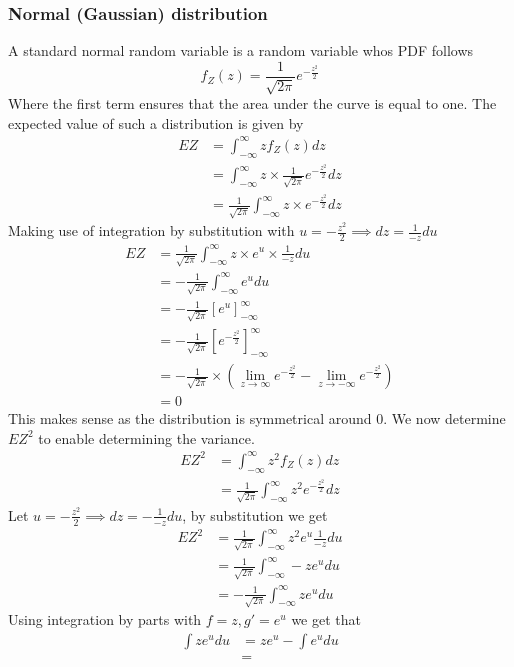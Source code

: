 \subsubsection{Normal (Gaussian) distribution}
A standard normal random variable is a random variable whos PDF follows
\[
    f_{Z}(z)=\frac{1}{\sqrt{2\pi}}e^{-\frac{z^{2}}{2}}
\]
Where the first term ensures that the area under the curve is equal to one. The expected value of such a distribution is given by
\begin{align*}
    EZ&=\int_{-\infty}^{\infty}zf_{Z}(z)dz \\
      &=\int_{-\infty}^{\infty}z\times\frac{1}{\sqrt{2\pi}}e^{-\frac{z^{2}}{2}}dz \\
      &=\frac{1}{\sqrt{2\pi}}\int_{-\infty}^{\infty}z\times e^{-\frac{z^{2}}{2}}dz 
\end{align*}
Making use of integration by substitution with $u=-\frac{z^{2}}{2}\implies dz=\frac{1}{-z}du$
\begin{align*}
    EZ&=\frac{1}{\sqrt{2\pi}}\int_{-\infty}^{\infty}z\times e^{u}\times\frac{1}{-z}du \\
      &=-\frac{1}{\sqrt{2\pi}}\int_{-\infty}^{\infty}e^{u}du \\
      &=-\frac{1}{\sqrt{2\pi}}\left[e^{u}\right]_{-\infty}^{\infty} \\
      &=-\frac{1}{\sqrt{2\pi}}\left[e^{-\frac{z^{2}}{2}}\right]_{-\infty}^{\infty} \\
      &=-\frac{1}{\sqrt{2\pi}}\times\left(\lim_{z\rightarrow\infty}e^{-\frac{z^{2}}{2}}-\lim_{z\rightarrow-\infty}e^{-\frac{z^{2}}{2}}\right) \\
      &=0
\end{align*}
This makes sense as the distribution is symmetrical around 0. We now determine $EZ^{2}$ to enable determining the variance.
\begin{align*}
    EZ^{2}&=\int_{-\infty}^{\infty}z^{2}f_{Z}(z)dz \\
       &=\frac{1}{\sqrt{2\pi}}\int_{-\infty}^{\infty}z^{2}e^{-\frac{z^{2}}{2}}dz
\end{align*}
Let $u=-\frac{z^{2}}{2}\implies dz=-\frac{1}{-z}du$, by substitution we get
\begin{align*}
    EZ^{2}&=\frac{1}{\sqrt{2\pi}}\int_{-\infty}^{\infty}z^{2}e^{u}\frac{1}{-z}du \\
          &=\frac{1}{\sqrt{2\pi}}\int_{-\infty}^{\infty}-ze^{u}du \\
          &=-\frac{1}{\sqrt{2\pi}}\int_{-\infty}^{\infty}ze^{u}du
\end{align*}
Using integration by parts with $f=z,g'=e^{u}$ we get that
\begin{align*}
    \int ze^{u}du&=ze^{u}-\int e^{u}du \\
           &=
\end{align*}
